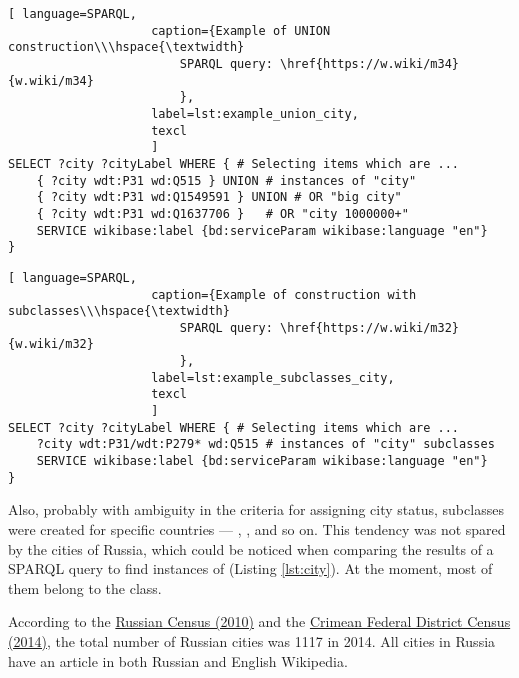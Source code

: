 \begin{lstlisting}[ language=SPARQL, 
                    caption={Example of UNION construction\\\hspace{\textwidth}
                        SPARQL query: \href{https://w.wiki/m34}{w.wiki/m34}
                        },
                    label=lst:example_union_city,
                    texcl 
                    ]
SELECT ?city ?cityLabel WHERE { # Selecting items which are ...
	{ ?city wdt:P31 wd:Q515 } UNION # instances of "city"            
	{ ?city wdt:P31 wd:Q1549591 } UNION # OR "big city"               
	{ ?city wdt:P31 wd:Q1637706 } 	# OR "city 1000000+"
	SERVICE wikibase:label {bd:serviceParam wikibase:language "en"}
}
\end{lstlisting}%


\begin{lstlisting}[ language=SPARQL, 
                    caption={Example of construction with subclasses\\\hspace{\textwidth}
                        SPARQL query: \href{https://w.wiki/m32}{w.wiki/m32}
                        },
                    label=lst:example_subclasses_city,
                    texcl 
                    ]
SELECT ?city ?cityLabel WHERE { # Selecting items which are ...
	?city wdt:P31/wdt:P279* wd:Q515 # instances of "city" subclasses
	SERVICE wikibase:label {bd:serviceParam wikibase:language "en"}
}
\end{lstlisting}%

Also, probably with ambiguity in the criteria for assigning city status, subclasses were created for specific countries — , ,  and so on. This tendency was not spared by the cities of Russia, which could be noticed when comparing the results of a SPARQL query to find instances of   (Listing \ref{lst:city}). At the moment, most of them belong to the  class.

According to the \href{http://www.gks.ru/free\_doc/new\_site/perepis2010/croc/Documents/Vol1/pub-01-03.pdf}{Russian Census (2010)} and the \href{https://rosstat.gov.ru/free\_doc/new\_site/population/demo/perepis\_krim/KRUM\_2015.pdf}{Crimean Federal District Census (2014)}, the total number of Russian cities was \num{1117} in 2014. All cities in Russia have an article in both Russian and English Wikipedia.

